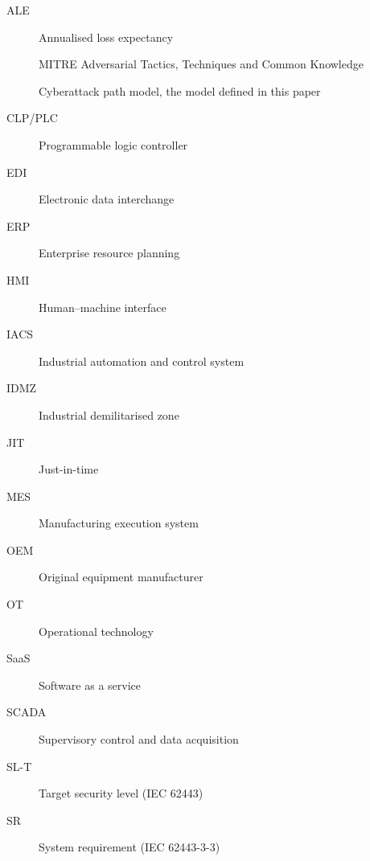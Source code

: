 \documentclass[11pt,a4paper]{article}
\begin{document}
\begin{description}
  \item[ALE] Annualised loss expectancy
  \item[\attck{}] MITRE Adversarial Tactics, Techniques and Common Knowledge
  \item[\capm{}] Cyberattack path model, the model defined in this paper
  \item[CLP/PLC] Programmable logic controller
  \item[EDI] Electronic data interchange
  \item[ERP] Enterprise resource planning
  \item[HMI] Human--machine interface
  \item[IACS] Industrial automation and control system
  \item[IDMZ] Industrial demilitarised zone
  \item[JIT] Just-in-time
  \item[MES] Manufacturing execution system
  \item[OEM] Original equipment manufacturer
  \item[OT] Operational technology
  \item[SaaS] Software as a service
  \item[SCADA] Supervisory control and data acquisition
  \item[SL-T] Target security level (IEC 62443)
  \item[SR] System requirement (IEC 62443-3-3)
\end{description}
\end{document}
